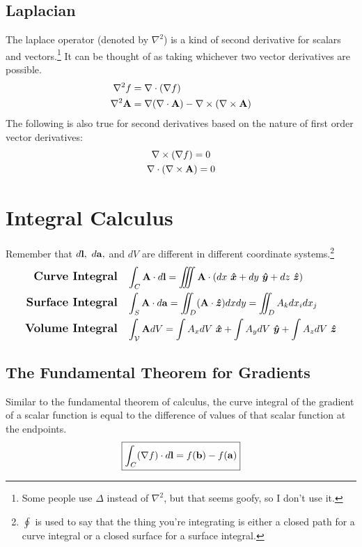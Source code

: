     \subsection*{Laplacian}
        The laplace operator (denoted by \(\nabla^2\)) is a kind of second derivative for scalars and vectors.\footnote{Some people use \(\Delta\) instead of \(\nabla^2\), but that seems goofy, so I don't use it.} It can be thought of as taking whichever two vector derivatives are possible. 
        \begin{align}
            \nabla^2f
            &=\nabla \cdot (\nabla f)
            \\
            \nabla^2 \vb{A} 
            &= \nabla(\nabla \cdot \vb{A}) - \nabla\times (\nabla \times \vb{A}) 
        \end{align}
        The following is also true for second derivatives based on the nature of first order vector derivatives:
        \begin{gather}
            \nabla\times (\nabla f)
            = 0
            \\
            \nabla \cdot (\nabla \times \vb{A}) 
            = 0 
        \end{gather}
\newpage
\section{Integral Calculus}      
    Remember that \(\dl*,~\da*,\) and $dV$ are different in different coordinate systems.\footnote{\(\oint\) is used to say that the thing you're integrating is either a closed path for a curve integral or a closed surface for a surface integral.}
    \length[0.5 cm]
    \begin{align}
        \textbf{ \large Curve Integral}&
        \quad\int_C \vb{A}\dl=\iiint\vb{A}\cdot\qty(dx\ \e{x}+dy\ \e{y}+dz\ \e{z})
        \\
        \textbf{\large Surface Integral}&\quad
        \int_S \vb{A}\da=\iint_D(\vb{A}\cdot\e{z})dxdy=\iint_D A_k dx_idx_j
        \\
        \textbf{\large Volume Integral}&\quad
        \int_{\mathcal{V}} \vb{A} dV=\int A_xdV\ \e{x}+\int A_ydV\ \e{y}+\int A_z dV\ \e{z}
    \end{align}
    \length

    \subsection*{The Fundamental Theorem for Gradients}
        Similar to the fundamental theorem of calculus, the curve integral of the gradient of a scalar function is equal to the difference of values of that scalar function at the endpoints. 
        \begin{equation}
            \boxed{\int_C(\nabla f)\dl=f(\mathbf{b})-f(\mathbf{a})}
        \end{equation}
